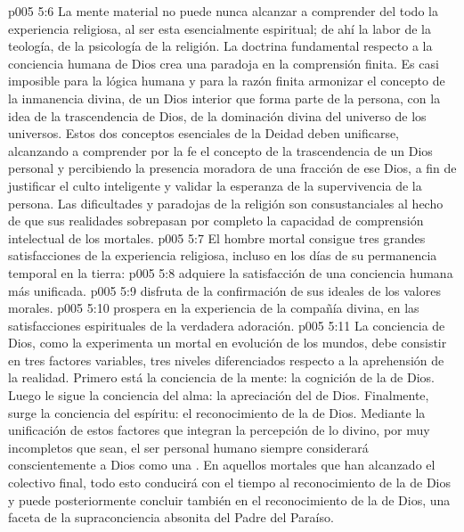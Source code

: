 \vs p005 5:6 \pc La mente material no puede nunca alcanzar a comprender del todo la experiencia religiosa, al ser esta esencialmente espiritual; de ahí la labor de la teología, de la psicología de la religión. La doctrina fundamental respecto a la conciencia humana de Dios crea una paradoja en la comprensión finita. Es casi imposible para la lógica humana y para la razón finita armonizar el concepto de la inmanencia divina, de un Dios interior que forma parte de la persona, con la idea de la trascendencia de Dios, de la dominación divina del universo de los universos. Estos dos conceptos esenciales de la Deidad deben unificarse, alcanzando a comprender por la fe el concepto de la trascendencia de un Dios personal y percibiendo la presencia moradora de una fracción de ese Dios, a fin de justificar el culto inteligente y validar la esperanza de la supervivencia de la persona. Las dificultades y paradojas de la religión son consustanciales al hecho de que sus realidades sobrepasan por completo la capacidad de comprensión intelectual de los mortales.
\vs p005 5:7 \pc El hombre mortal consigue tres grandes satisfacciones de la experiencia religiosa, incluso en los días de su permanencia temporal en la tierra:
\vs p005 5:8  adquiere la satisfacción de una conciencia humana más unificada.
\vs p005 5:9  disfruta de la confirmación de sus ideales de los valores morales.
\vs p005 5:10  prospera en la experiencia de la compañía divina, en las satisfacciones espirituales de la verdadera adoración.
\vs p005 5:11 \pc La conciencia de Dios, como la experimenta un mortal en evolución de los mundos, debe consistir en tres factores variables, tres niveles diferenciados respecto a la aprehensión de la realidad. Primero está la conciencia de la mente: la cognición de la  de Dios. Luego le sigue la conciencia del alma: la apreciación del  de Dios. Finalmente, surge la conciencia del espíritu: el reconocimiento de la  de Dios. Mediante la unificación de estos factores que integran la percepción de lo divino, por muy incompletos que sean, el ser personal humano siempre considerará conscientemente a Dios como una . En aquellos mortales que han alcanzado el colectivo final, todo esto conducirá con el tiempo al reconocimiento de la  de Dios y puede posteriormente concluir también en el reconocimiento de la  de Dios, una faceta de la supraconciencia absonita del Padre del Paraíso.
